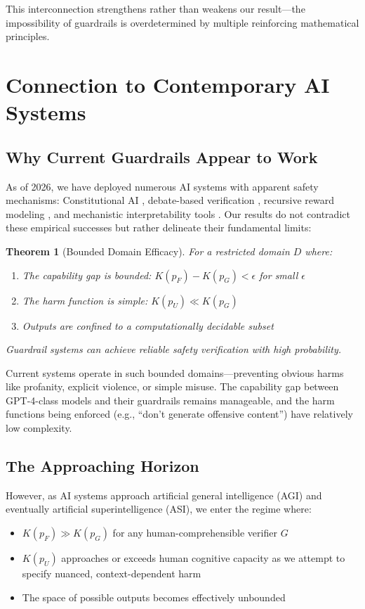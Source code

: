 \documentclass[11pt]{article}
\newtheorem{theorem}{Theorem}
\begin{document}
This interconnection strengthens rather than weakens our result—the impossibility of guardrails is overdetermined by multiple reinforcing mathematical principles.

\section{Connection to Contemporary AI Systems}

\subsection{Why Current Guardrails Appear to Work}

As of 2026, we have deployed numerous AI systems with apparent safety mechanisms: Constitutional AI \cite{amodei2023constitutional}, debate-based verification \cite{irving2018debate}, recursive reward modeling \cite{leike2018recursive}, and mechanistic interpretability tools \cite{olah2020zoom}. Our results do not contradict these empirical successes but rather delineate their fundamental limits:

\begin{theorem}[Bounded Domain Efficacy]
For a restricted domain $D$ where:
\begin{enumerate}
\item The capability gap is bounded: $K(p_F) - K(p_G) < \epsilon$ for small $\epsilon$
\item The harm function is simple: $K(p_U) \ll K(p_G)$  
\item Outputs are confined to a computationally decidable subset
\end{enumerate}
Guardrail systems can achieve reliable safety verification with high probability.
\end{theorem}

Current systems operate in such bounded domains—preventing obvious harms like profanity, explicit violence, or simple misuse. The capability gap between GPT-4-class models and their guardrails remains manageable, and the harm functions being enforced (e.g., ``don't generate offensive content'') have relatively low complexity.

\subsection{The Approaching Horizon}

However, as AI systems approach artificial general intelligence (AGI) and eventually artificial superintelligence (ASI), we enter the regime where:
\begin{itemize}
\item $K(p_F) \gg K(p_G)$ for any human-comprehensible verifier $G$
\item $K(p_U)$ approaches or exceeds human cognitive capacity as we attempt to specify nuanced, context-dependent harm
\item The space of possible outputs becomes effectively unbounded
\end{itemize}
\end{document}
